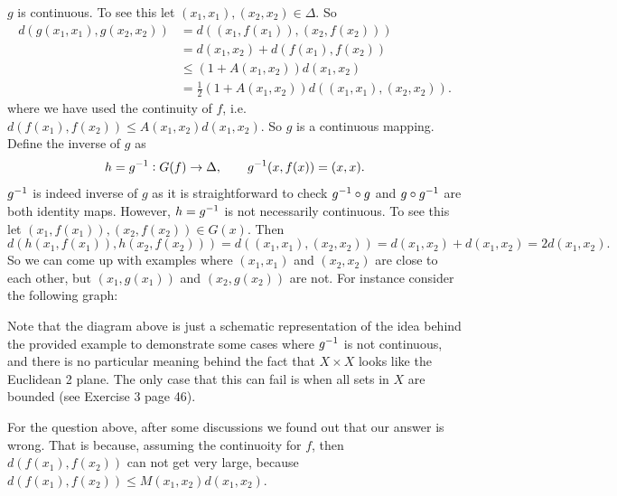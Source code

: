\begin{solution}
	$ g $ is continuous. To see this let $ (x_1,x_1), (x_2,x_2) \in \Delta $. So
	\begin{align*}
		d(g(x_1,x_1), g(x_2,x_2)) &= d((x_1,f(x_1)), (x_2,f(x_2))) \\
		&= d(x_1,x_2) + d(f(x_1),f(x_2)) \\
		&\leq (1+A(x_1,x_2))d(x_1,x_2) \\
		&= \frac{1}{2}(1+A(x_1,x_2))d((x_1,x_1), (x_2,x_2)).
	\end{align*}
	where we have used the continuity of $ f $, i.e. $ d(f(x_1),f(x_2)) \leq A(x_1,x_2) d(x_1,x_2) $.
	So $ g $ is a continuous mapping. Define the inverse of $ g $ as
	\[ h= g^{-1}: G(f)\to \Delta, \qquad g^{-1}(x,f(x)) = (x,x). \]
	$ g^{-1} $ is indeed inverse of $ g $ as it is straightforward to check $ g^{-1}\circ g $ and $ g\circ g^{-1} $ are both identity maps. However, $ h = g^{-1} $ is not necessarily continuous. To see this let $ (x_1,f(x_1)), (x_2,f(x_2)) \in G(x) $. Then
	\[ d(h(x_1,f(x_1)), h(x_2,f(x_2))) = d((x_1,x_1),(x_2,x_2)) = d(x_1,x_2) + d(x_1,x_2) = 2d(x_1,x_2). \]
	So we can come up with examples where $ (x_1,x_1) $ and $ (x_2,x_2) $ are close to each other, but $ (x_1,g(x_1)) $ and $ (x_2,g(x_2)) $ are not. For instance consider the following graph:
	
	Note that the diagram above is just a schematic representation of the idea behind the provided example to demonstrate some cases where $ g^{-1} $ is not continuous, and there is no particular meaning behind the fact that $ X\times X $ looks like the Euclidean 2 plane. The only case that this can fail is when all sets in $ X $ are bounded (see Exercise 3 page 46).
\end{solution}

\begin{observation}
	For the question above, after some discussions we found out that our answer is wrong. That is because, assuming the continuoity for $ f $, then $ d(f(x_1),f(x_2)) $ can not get very large, because
	$ d(f(x_1),f(x_2)) \leq M(x_1,x_2) d(x_1,x_2) $. 
\end{observation}






